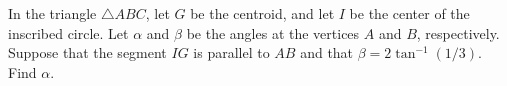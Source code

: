 In the triangle $\triangle ABC$, let $G$ be the centroid, and let $I$ be the center of the inscribed circle.
Let $\alpha$ and $\beta$ be the angles at the vertices $A$ and $B$, respectively.
Suppose that the segment $IG$ is parallel to $AB$ and that $\beta = 2 \tan^{-1} (1/3)$. Find $\alpha$.
